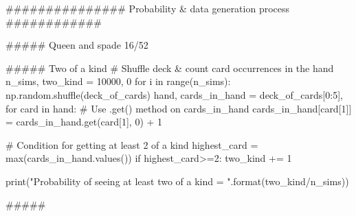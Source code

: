 ############### Probability & data generation process  ############

##### Queen and spade
16/52

##### Two of a kind
# Shuffle deck & count card occurrences in the hand
n_sims, two_kind = 10000, 0
for i in range(n_sims):
    np.random.shuffle(deck_of_cards)
    hand, cards_in_hand = deck_of_cards[0:5], {}
    for card in hand:
        # Use .get() method on cards_in_hand
        cards_in_hand[card[1]] = cards_in_hand.get(card[1], 0) + 1
    
    # Condition for getting at least 2 of a kind
    highest_card = max(cards_in_hand.values())
    if  highest_card>=2: 
        two_kind += 1

print("Probability of seeing at least two of a kind = {} ".format(two_kind/n_sims))

##### 
